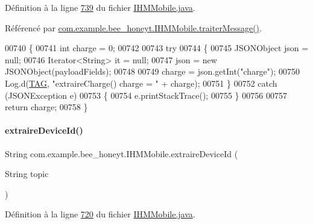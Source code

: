 Définition à la ligne \hyperlink{_i_h_m_mobile_8java_source_l00739}{739} du fichier \hyperlink{_i_h_m_mobile_8java_source}{I\+H\+M\+Mobile.\+java}.



Référencé par \hyperlink{_i_h_m_mobile_8java_source_l00374}{com.\+example.\+bee\+\_\+honeyt.\+I\+H\+M\+Mobile.\+traiter\+Message()}.


\begin{DoxyCode}
00740     \{
00741         \textcolor{keywordtype}{int} charge = 0;
00742 
00743         \textcolor{keywordflow}{try}
00744         \{
00745             JSONObject json = null;
00746             Iterator<String> it = null;
00747             json = \textcolor{keyword}{new} JSONObject(payloadFields);
00748 
00749             charge = json.getInt(\textcolor{stringliteral}{"charge"});
00750             Log.d(\hyperlink{classcom_1_1example_1_1bee__honeyt_1_1_i_h_m_mobile_a366987bf9bb2ed1010b2f967d4efa263}{TAG}, \textcolor{stringliteral}{"extraireCharge() charge = "} + charge);
00751         \}
00752         \textcolor{keywordflow}{catch} (JSONException e)
00753         \{
00754             e.printStackTrace();
00755         \}
00756 
00757         \textcolor{keywordflow}{return} charge;
00758     \}
\end{DoxyCode}
\mbox{\label{classcom_1_1example_1_1bee__honeyt_1_1_i_h_m_mobile_ab957cc8fd25c104c48341f7e4141e173}} 
\paragraph{\texorpdfstring{extraire\+Device\+Id()}{extraireDeviceId()}}
{\footnotesize\ttfamily String com.\+example.\+bee\+\_\+honeyt.\+I\+H\+M\+Mobile.\+extraire\+Device\+Id (\begin{DoxyParamCaption}\item[{String}]{topic }\end{DoxyParamCaption})}



Définition à la ligne \hyperlink{_i_h_m_mobile_8java_source_l00720}{720} du fichier \hyperlink{_i_h_m_mobile_8java_source}{I\+H\+M\+Mobile.\+java}.


